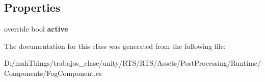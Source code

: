 \subsection*{Properties}
\begin{DoxyCompactItemize}
\item 
\mbox{\label{class_unity_engine_1_1_post_processing_1_1_fog_component_aea59b9db2bd9686b92d88154abc4de3c}} 
override bool {\bfseries active}
\end{DoxyCompactItemize}


The documentation for this class was generated from the following file\+:\begin{DoxyCompactItemize}
\item 
D\+:/mah\+Things/trabajos\+\_\+clase/unity/\+R\+T\+S/\+R\+T\+S/\+Assets/\+Post\+Processing/\+Runtime/\+Components/Fog\+Component.\+cs\end{DoxyCompactItemize}
